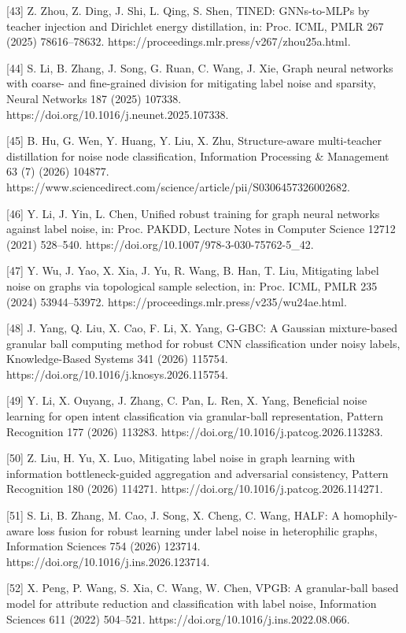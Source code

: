 {[}43{]} Z. Zhou, Z. Ding, J. Shi, L. Qing, S. Shen, TINED: GNNs-to-MLPs by teacher injection and Dirichlet energy distillation, in: Proc. ICML, PMLR 267 (2025) 78616--78632. https://proceedings.mlr.press/v267/zhou25a.html.

{[}44{]} S. Li, B. Zhang, J. Song, G. Ruan, C. Wang, J. Xie, Graph neural networks with coarse- and fine-grained division for mitigating label noise and sparsity, Neural Networks 187 (2025) 107338. https://doi.org/10.1016/j.neunet.2025.107338.

{[}45{]} B. Hu, G. Wen, Y. Huang, Y. Liu, X. Zhu, Structure-aware multi-teacher distillation for noise node classification, Information Processing \& Management 63 (7) (2026) 104877. https://www.sciencedirect.com/science/article/pii/S0306457326002682.

{[}46{]} Y. Li, J. Yin, L. Chen, Unified robust training for graph neural networks against label noise, in: Proc. PAKDD, Lecture Notes in Computer Science 12712 (2021) 528--540. https://doi.org/10.1007/978-3-030-75762-5\_42.

{[}47{]} Y. Wu, J. Yao, X. Xia, J. Yu, R. Wang, B. Han, T. Liu, Mitigating label noise on graphs via topological sample selection, in: Proc. ICML, PMLR 235 (2024) 53944--53972. https://proceedings.mlr.press/v235/wu24ae.html.

{[}48{]} J. Yang, Q. Liu, X. Cao, F. Li, X. Yang, G-GBC: A Gaussian mixture-based granular ball computing method for robust CNN classification under noisy labels, Knowledge-Based Systems 341 (2026) 115754. https://doi.org/10.1016/j.knosys.2026.115754.

{[}49{]} Y. Li, X. Ouyang, J. Zhang, C. Pan, L. Ren, X. Yang, Beneficial noise learning for open intent classification via granular-ball representation, Pattern Recognition 177 (2026) 113283. https://doi.org/10.1016/j.patcog.2026.113283.

{[}50{]} Z. Liu, H. Yu, X. Luo, Mitigating label noise in graph learning with information bottleneck-guided aggregation and adversarial consistency, Pattern Recognition 180 (2026) 114271. https://doi.org/10.1016/j.patcog.2026.114271.

{[}51{]} S. Li, B. Zhang, M. Cao, J. Song, X. Cheng, C. Wang, HALF: A homophily-aware loss fusion for robust learning under label noise in heterophilic graphs, Information Sciences 754 (2026) 123714. https://doi.org/10.1016/j.ins.2026.123714.

{[}52{]} X. Peng, P. Wang, S. Xia, C. Wang, W. Chen, VPGB: A granular-ball based model for attribute reduction and classification with label noise, Information Sciences 611 (2022) 504--521. https://doi.org/10.1016/j.ins.2022.08.066.

